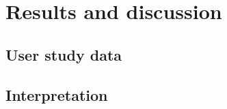 \chapter{Results and discussion}
\label{sec:results_and_discussion}

\section{User study data}
\label{user_study_data}

\section{Interpretation}
\label{interpretation}

